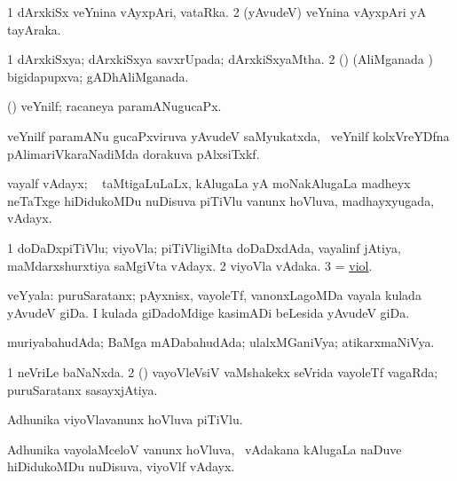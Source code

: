 \bentry
{} 
\gl{\nA}
\expl{}
\bmng
\bnum
\num{1} dArxkiSx veYnina vAyxpAri, vataRka. 
\num{2} (yAvudeV) veYnina vAyxpAri yA tayAraka. 
\enum
\emng
\eentry

\bentry
{} 
\gl{\gu}
\expl{}
\bmng
\bnum
\num{1} dArxkiSxya; dArxkiSxya savxrUpada; dArxkiSxyaMtha. 
\num{2} (\rUpa) (AliMganada \vi) bigidapupxva; gADhAliMganada. 
\enum
\emng
\eentry

\bentry
{} 
\gl{\gu}
\expl{}
\bmng
 (\ravi) veYnilf;  racaneya paramANugucaPx. 
\emng
\eentry

\bentry
{} 
\gl{\nA}
\expl{}
\bmng
 veYnilf paramANu gucaPxviruva yAvudeV saMyukatxda, \kanmu\ veYnilf kolxVreYDfna pAlimariVkaraNadiMda dorakuva pAlxsiTxkf. 
\emng
\eentry

\bentry
{} 
\gl{\nA}
\expl{}
\bmng
 vayalf vAdayx; \sA\  taMtigaLuLaLx, kAlugaLa yA moNakAlugaLa madheyx neTaTxge hiDidukoMDu nuDisuva piTiVlu \mo vanunx hoVluva, madhayxyugada, vAdayx.  
\emng
\eentry

\bentry
{} 
\gl{\nA}
\expl{}
\bmng
\bnum
\num{1} doDaDxpiTiVlu; viyoVla; piTiVligiMta doDaDxdAda, vayalinf jAtiya, maMdarxshurxtiya saMgiVta vAdayx. 
\num{2} viyoVla vAdaka. 
\num{3} = \hyperlink{viol}{viol}. 
\enum
\emng
\eentry

\bentry
{} 
\gl{\nA}
\expl{}
\bmng
 veYyala: 
\banum
{} puruSaratanx; pAyxnisx, vayoleTf, \mo vanonxLagoMDa vayala kulada yAvudeV giDa. 
 I kulada giDadoMdige kasimADi beLesida yAvudeV giDa. 
\eanum
\emng
\eentry

\bentry
{} 
\gl{\gu}
\expl{}
\bmng
 muriyabahudAda; BaMga mADabahudAda; ulalxMGaniVya; atikarxmaNiVya. 
\emng
\eentry

\bentry
{} 
\gl{\gu}
\expl{}
\bmng
\bnum
\num{1} neVriLe baNaNxda. 
\num{2} (\savi) vayoVleVsiV vaMshakekx seVrida vayoleTf vagaRda; puruSaratanx sasayxjAtiya. 
\enum
\emng
\eentry

\bentry
{} 
\gl{\nA}
\expl{}
\bmng
 Adhunika viyoVlavanunx hoVluva piTiVlu. 
\emng
\eentry

\bentry
{} 
\gl{\nA}
\expl{}
\bmng
 Adhunika vayolaMceloV  vanunx hoVluva, \kanmu\ vAdakana kAlugaLa naDuve hiDidukoMDu nuDisuva, viyoVlf vAdayx. 
\emng
\eentry

